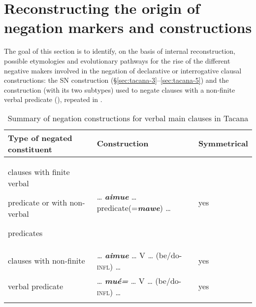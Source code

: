 \documentclass[output=paper]{langsci/langscibook}
\begin{document}

\newpage
\section{Reconstructing the origin of negation markers and constructions}\label{sec:tacana-10}

The goal of this section is to identify, on the basis of internal
reconstruction, possible etymologies and evolutionary pathways for the rise
of the different negative makers involved in the negation of
declarative or interrogative clausal constructions: the SN construction
(§\ref{sec:tacana-3}--\ref{sec:tacana-5}) and the construction (with its
two subtypes) used to negate clauses with a non-finite verbal predicate
(), repeated in .
 
\begin{table}\begin{small}
\caption{Summary of negation constructions for verbal main clauses in Tacana}\label{tab:tacana-3}
\begin{tabularx}{\textwidth}{Qll}
\lsptoprule
Type of negated constituent & Construction & Symmetrical\\\midrule
clauses with finite verbal\newline \rule{0pt}{1ex}\hspace{2ex}predicate or with
non-verbal\newline \rule{0pt}{1ex}\hspace{2ex}predicates & …  \textbf{\textit{aimue}} … predicate(=\textbf{\textit{mawe}}) … & yes\\
clauses with non-finite & \textit{…}
\textbf{\textit{aimue}} … V … (be/do-\textsc{infl}) … & yes \\
\hspace{2ex}verbal predicate & … \textbf{\textit{mué=}} … V … (be/do-\textsc{infl}) … & yes\\
\lspbottomrule
\end{tabularx}\end{small}\end{table}
\end{document}
